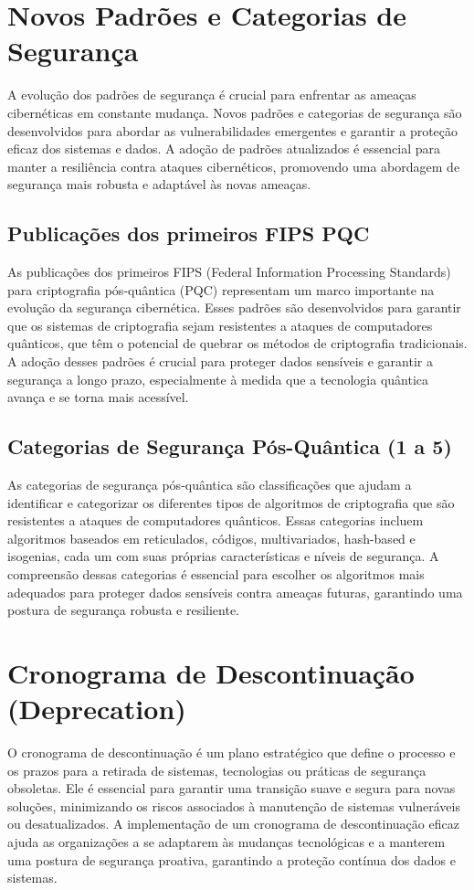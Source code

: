     \section{Novos Padrões e Categorias de Segurança}
        A evolução dos padrões de segurança é crucial para enfrentar as ameaças cibernéticas em constante mudança.
        Novos padrões e categorias de segurança são desenvolvidos para abordar as vulnerabilidades emergentes e garantir a proteção eficaz dos sistemas e dados.
        A adoção de padrões atualizados é essencial para manter a resiliência contra ataques cibernéticos, promovendo uma abordagem de segurança mais robusta e adaptável às novas ameaças.
        \subsection{Publicações dos primeiros FIPS PQC} %
            As publicações dos primeiros FIPS (Federal Information Processing Standards) para criptografia pós-quântica (PQC) representam um marco importante na evolução da segurança cibernética.
            Esses padrões são desenvolvidos para garantir que os sistemas de criptografia sejam resistentes a ataques de computadores quânticos, que têm o potencial de quebrar os métodos de criptografia tradicionais.
            A adoção desses padrões é crucial para proteger dados sensíveis e garantir a segurança a longo prazo, especialmente à medida que a tecnologia quântica avança e se torna mais acessível.
        \subsection{Categorias de Segurança Pós-Quântica (1 a 5)} %
            As categorias de segurança pós-quântica são classificações que ajudam a identificar e categorizar os diferentes tipos de algoritmos de criptografia que são resistentes a ataques de computadores quânticos.
            Essas categorias incluem algoritmos baseados em reticulados, códigos, multivariados, hash-based e isogenias, cada um com suas próprias características e níveis de segurança.
            A compreensão dessas categorias é essencial para escolher os algoritmos mais adequados para proteger dados sensíveis contra ameaças futuras, garantindo uma postura de segurança robusta e resiliente.
    \section{Cronograma de Descontinuação (Deprecation)}
        O cronograma de descontinuação é um plano estratégico que define o processo e os prazos para a retirada de sistemas, tecnologias ou práticas de segurança obsoletas.
        Ele é essencial para garantir uma transição suave e segura para novas soluções, minimizando os riscos associados à manutenção de sistemas vulneráveis ou desatualizados.
        A implementação de um cronograma de descontinuação eficaz ajuda as organizações a se adaptarem às mudanças tecnológicas e a manterem uma postura de segurança proativa, garantindo a proteção contínua dos dados e sistemas.
